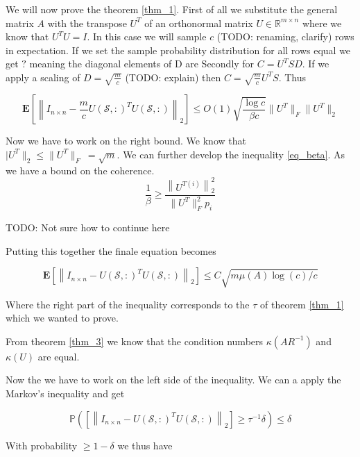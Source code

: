 \documentclass{article}
\begin{document}
We will now prove the theorem \ref{thm_1}. First of all we substitute the
general matrix $A$ with the transpose $U^T$ of an orthonormal matrix $U \in
\mathbb{R}^{m \times n}$ where we know that $U^TU=I$. In this case we will
sample $c$ (TODO: renaming, clarify) rows in expectation. If we set the sample probability distribution for
all rows equal we get $?$ meaning the diagonal elements of D are Secondly for $C=U^TSD$. If we apply a scaling
of $D=\sqrt{\frac{m}{c}}$ (TODO: explain) then
$C=\sqrt{\frac{m}{c}}U^TS$. Thus

\begin{equation} \label{eq_intermed1}
\mathbf{E}\left[\left\|I_{n \times n}-\frac{m}{c}U(\mathcal{S},:)^TU(\mathcal{S},:)\right\|_2\right] \leq O(1)
\sqrt{\frac{\log c}{\beta c}}\|U^T\|_{F}\|U^T\|_{2}
\end{equation}

Now we have to work on the right bound. We know  that $|U^T\|_{2} \leq \|U^T\|_{F}\
= \sqrt{m}$. We can further develop the inequality \ref{eq_beta}. As we have a bound on the coherence. 
\begin{equation} \label{eq_beta2}
\frac{1}{\beta} \geq \frac{\left\|U^{T{(i)}}\right\|^2_2}{\|U^T\|_{F}^2 p_i}
\end{equation}

\bigskip
TODO: Not sure how to continue here
\bigskip

Putting this together the finale equation becomes

\begin{equation} \label{eq_intermed2}
\mathbf{E}\left[\left\|I_{n \times n}-U(\mathcal{S},:)^TU(\mathcal{S},:)\right\|_{2}\right] \leq C
\sqrt{m \mu(A) \log (c) / c}
\end{equation}

Where the right part of the inequality corresponds to the $\tau$ of theorem \ref{thm_1} which we wanted to prove.

From theorem \ref{thm_3} we know that the condition numbers  $\kappa(AR^{-1})$ and $\kappa(U)$ are equal.

Now the we have to work on the left side of the inequality. We can a apply the Markov's inequality and get

\begin{equation} \label{eq_intermed3}
\mathbb{P}(\left[\left\|I_{n \times n}-U(\mathcal{S},:)^TU(\mathcal{S},:)\right\|_{2}\right] \geq \tau^{-1}\delta) \leq \delta
\end{equation}

With probability $\geq 1- \delta$ we thus have
\end{document}
